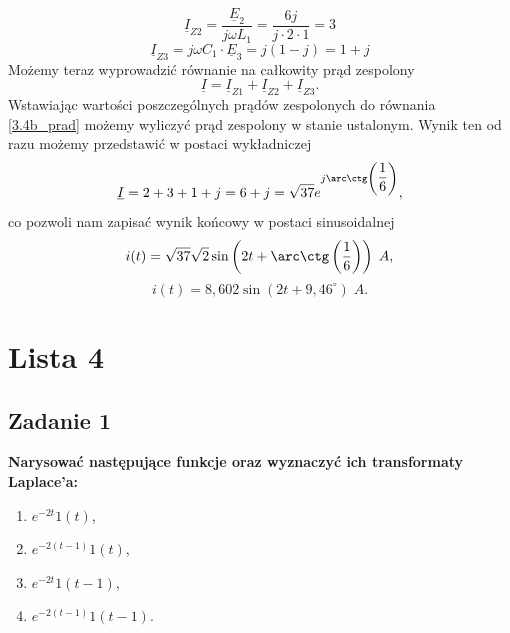 \documentclass[12pt, a4paper]{article}
\begin{document}
\begin{enumerate}[label=\alph*)]
\begin{equation*}
        \end{equation*}
        \begin{equation*}
          \underline{I}_{Z2} = \frac{\underline{E}_2}{j\omega L_1} = \frac{6j}
          {j\cdot2\cdot1} = 3
        \end{equation*}
        \begin{equation*}
          \underline{I}_{Z3} = j\omega C_1\cdot\underline{E}_3 = j(1-j) = 1+j
        \end{equation*}
        Możemy teraz wyprowadzić równanie na całkowity prąd zespolony
        \begin{equation}\label{3.4b_prad}
          \underline{I} = \underline{I}_{Z1} + \underline{I}_{Z2} + \underline{I}_{Z3}.
        \end{equation}
        Wstawiając wartości poszczególnych prądów zespolonych do równania \ref{3.4b_prad}
        możemy wyliczyć prąd zespolony w stanie ustalonym. Wynik ten od razu możemy przedstawić
        w postaci wykładniczej
        \begin{equation*}
          \underline{I} =2+3+1+j = 6 + j = \sqrt{37}e^{j\arc \ctg\left(
          \dfrac{1}{6}\right)},
        \end{equation*}
        co pozwoli nam zapisać wynik końcowy w postaci sinusoidalnej
        \begin{equation*}
          i(t) = \sqrt{37}\sqrt{2}\sin\left(2t+\arc \ctg\left(\dfrac{1}{6}\right)\right)\; A,
        \end{equation*}
        \begin{equation*}
          i(t) = 8,602\sin\left(2t+9,46^\circ\right)\; A.
        \end{equation*}
\end{enumerate}

\section{Lista 4}
\subsection{Zadanie 1}
\textbf{Narysować następujące funkcje oraz wyznaczyć ich transformaty Laplace’a:}
\begin{enumerate}[label=\alph*)]
  \item $e^{-2t} 1(t)$,
  \item $e^{-2(t-1)} 1(t)$,
  \item $e^{-2t} 1(t-1)$,
  \item $e^{-2(t-1)} 1(t-1)$.
\end{enumerate}
\end{document}

